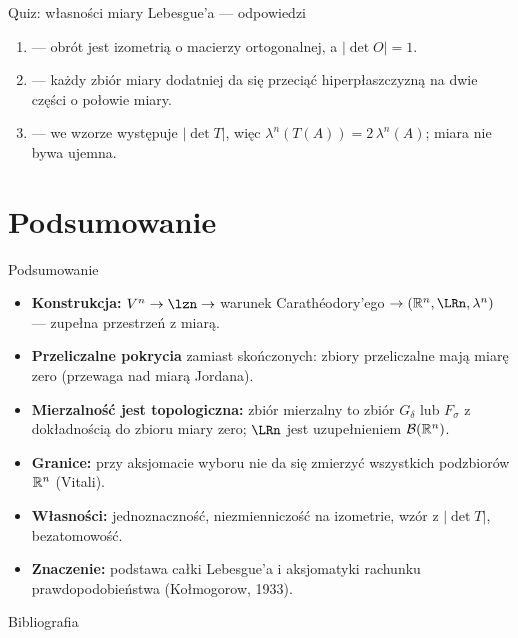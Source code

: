 \documentclass[aspectratio=169,11pt,t,envcountsect,professionalfonts]{beamer}
\begin{document}
\begin{frame}{Quiz: własności miary Lebesgue'a --- odpowiedzi}
  \begin{enumerate}
    \item \TAK{} --- obrót jest izometrią o macierzy ortogonalnej, a $|\det O| = 1$.
    \item \NIE{} --- każdy zbiór miary dodatniej da się przeciąć hiperpłaszczyzną na dwie części o połowie miary.
    \item \NIE{} --- we wzorze występuje $|\det T|$, więc $\lambda^n(T(A)) = 2\,\lambda^n(A)$; miara nie bywa ujemna.
  \end{enumerate}
\end{frame}

\section{Podsumowanie}

\begin{frame}{Podsumowanie}
  \begin{itemize}
    \item \textbf{Konstrukcja:} $V^n \to \lzn \to$ warunek Carathéodory'ego $\to (\Rn, \LRn, \lambda^n)$ --- zupełna przestrzeń z miarą.
    \item \textbf{Przeliczalne pokrycia} zamiast skończonych: zbiory przeliczalne mają miarę zero (przewaga nad miarą Jordana).
    \item \textbf{Mierzalność jest topologiczna:} zbiór mierzalny to zbiór $G_\delta$ lub $F_\sigma$ z dokładnością do zbioru miary zero; $\LRn$ jest uzupełnieniem $\mathcal{B}({\mathbb{R}^{n}})$.
    \item \textbf{Granice:} przy aksjomacie wyboru nie da się zmierzyć wszystkich podzbiorów $\mathbb{R}^{n}$ (Vitali).
    \item \textbf{Własności:} jednoznaczność, niezmienniczość na izometrie, wzór z $|\det T|$, bezatomowość.
    \item \textbf{Znaczenie:} podstawa całki Lebesgue'a i aksjomatyki rachunku prawdopodobieństwa (Kołmogorow, 1933).
  \end{itemize}
\end{frame}

\begin{frame}{Bibliografia}

\nocite{*}

\printbibliography

\end{frame}
\end{document}
